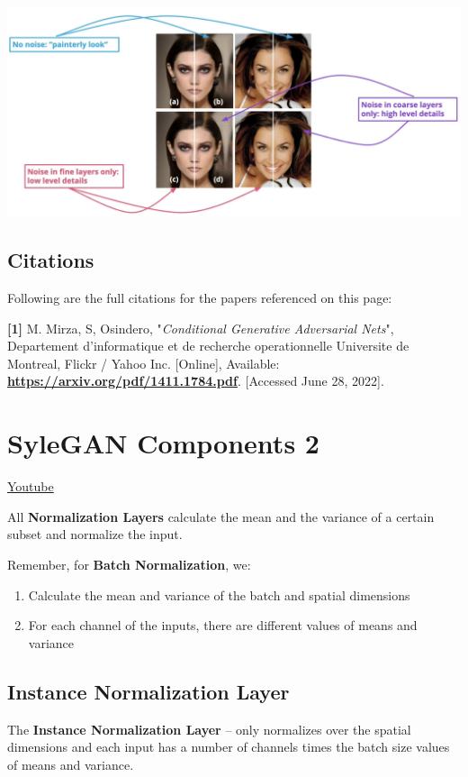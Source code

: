 \includegraphics[width=1\linewidth]{img//genAdvNet//modernGAN/noiseVSnoNoise.png}

\subsection{Citations}
Following are the full citations for the papers referenced on this page: \newline

\textbf{[1]} M. Mirza, S, Osindero, "\textit{Conditional Generative Adversarial Nets}", Departement d’informatique et de recherche operationnelle Universite de Montreal, Flickr / Yahoo Inc. [Online], Available: \href{https://arxiv.org/pdf/1411.1784.pdf}{\textbf{https://arxiv.org/pdf/1411.1784.pdf}}. [Accessed June 28, 2022].

\section{SyleGAN Components 2}
\href{https://www.youtube.com/watch?v=Cs467j73Ml0&t=3s}{Youtube} \newline

All \textbf{Normalization Layers} calculate the mean and the variance of a certain subset and normalize the input. \newline

Remember, for \textbf{Batch Normalization}, we:

\begin{enumerate}
    \item Calculate the mean and variance of the batch and spatial dimensions
    \item For each channel of the inputs, there are different values of means and variance
\end{enumerate}

\subsection{Instance Normalization Layer}
The \textbf{Instance Normalization Layer} – only normalizes over the spatial dimensions and each input has a number of channels times the batch size values of means and variance.

